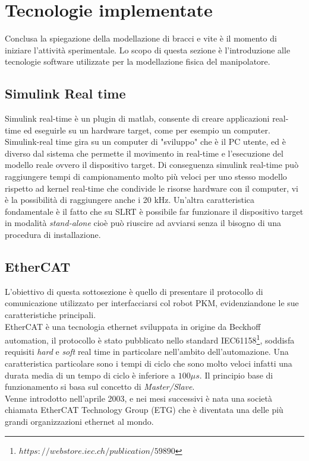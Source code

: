 \section{Tecnologie implementate}
Conclusa la spiegazione della modellazione di bracci e vite è il momento di iniziare l'attività sperimentale. Lo scopo di questa sezione è l'introduzione alle tecnologie software utilizzate per la modellazione fisica del manipolatore.
\subsection{Simulink Real time}
Simulink real-time è un plugin di matlab, consente di creare applicazioni real-time ed eseguirle su un hardware target, come per esempio un computer. Simulink-real time gira su un computer di "sviluppo" che è il PC utente, ed è diverso dal sistema che permette il movimento in real-time e l'esecuzione del modello reale ovvero il dispositivo target. Di conseguenza simulink real-time può raggiungere tempi di campionamento molto più veloci per uno stesso modello rispetto ad kernel real-time che condivide le risorse hardware con il computer, vi è la possibilità di raggiungere anche i 20 kHz. 
Un'altra caratteristica fondamentale è il fatto che su SLRT è possibile far funzionare il dispositivo target in modalità \textit{stand-alone} cioè può riuscire ad avviarsi senza il bisogno di una procedura di installazione. 

\subsection{EtherCAT}
L'obiettivo di questa sottosezione è quello di presentare il protocollo di comunicazione utilizzato per interfacciarsi col robot PKM, evidenziandone le sue caratteristiche principali.\\
EtherCAT è una tecnologia ethernet sviluppata in origine da Beckhoff automation, il protocollo è stato pubblicato nello standard IEC61158\footnote{${https://webstore.iec.ch/publication/59890}$}, soddisfa requisiti \textit{hard} e \textit{soft} real time in particolare nell'ambito dell'automazione. Una caratteristica particolare sono i tempi di ciclo che sono molto veloci infatti una durata media di un tempo di ciclo è inferiore a $100 \mu s$. Il principio base di funzionamento si basa sul concetto di \textit{Master/Slave}.
\\ Venne introdotto nell'aprile 2003, e nei mesi successivi è nata una società chiamata EtherCAT Technology Group (ETG) che è diventata una delle più grandi organizzazioni ethernet al mondo.
